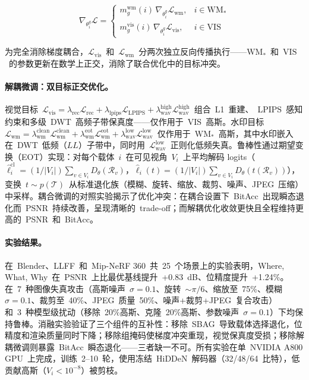 \begin{equation}
\nabla_{\theta_i^g} \mathcal{L} = \begin{cases} m_g^{\mathrm{wm}}(i)\,\nabla_{\theta_i^g} \mathcal{L}_{\mathrm{wm}}, & i \in \mathrm{WM}_* \\ m_g^{\mathrm{vis}}(i)\,\nabla_{\theta_i^g} \mathcal{L}_{\mathrm{vis}}, & i \in \mathrm{VIS} \end{cases}
\end{equation}

为完全消除梯度耦合，$\mathcal{L}_{\mathrm{vis}}$~和~$\mathcal{L}_{\mathrm{wm}}$~分两次独立反向传播执行——$\mathrm{WM}_*$~和~$\mathrm{VIS}$~的参数更新在数学上正交，消除了联合优化中的目标冲突。

\paragraph{解耦微调：双目标正交优化。}
视觉目标~$\mathcal{L}_{\mathrm{vis}} = \lambda_{\mathrm{rec}}\mathcal{L}_{\mathrm{rec}} + \lambda_{\mathrm{lpips}}\mathcal{L}_{\mathrm{LPIPS}} + \lambda_{\mathrm{wav}}^{\mathrm{high}}\mathcal{L}_{\mathrm{wav}}^{\mathrm{high}}$~组合~L1~重建、~LPIPS~感知约束和多级~DWT~高频子带保真度——仅作用于~VIS~高斯。水印目标~$\mathcal{L}_{\mathrm{wm}} = \lambda_{\mathrm{wm}}^{\mathrm{clean}}\mathcal{L}_{\mathrm{wm}}^{\mathrm{clean}} + \lambda_{\mathrm{wm}}^{\mathrm{eot}}\mathcal{L}_{\mathrm{wm}}^{\mathrm{eot}} + \lambda_{\mathrm{wav}}^{\mathrm{low}}\mathcal{L}_{\mathrm{wav}}^{\mathrm{low}}$~仅作用于~$\mathrm{WM}_*$~高斯，其中水印嵌入在~DWT~低频（$LL$）子带中，同时用~$\mathcal{L}_{\mathrm{wav}}^{\mathrm{low}}$~正则化低频失真。鲁棒性通过期望变换（EOT）实现：对每个载体~$i$~在可见视角~$V_i$~上平均解码 logits（$\hat{\ell}_i^{\mathrm{cl}} = (1/|V_i|)\sum_{v \in V_i} D_{\theta}(\mathcal{R}_v)$，$\hat{\ell}_i(t) = (1/|V_i|)\sum_{v \in V_i} D_{\theta}(t(\mathcal{R}_v))$），变换~$t \sim p(\mathcal{T})$~从标准退化族（模糊、旋转、缩放、裁剪、噪声、JPEG~压缩）中采样。耦合微调的对照实验揭示了优化冲突：在耦合设置下~BitAcc~出现瞬态退化而~PSNR~持续改善，呈现清晰的~trade-off；而解耦优化收敛更快且全程维持更高的~PSNR~和~BitAcc。

\paragraph{实验结果。}
在~Blender、LLFF~和~Mip-NeRF 360~共~25~个场景上的实验表明，Where, What, Why~在~PSNR~上比最优基线提升~+0.83~dB、位精度提升~+1.24\%。在~7~种图像失真攻击（高斯噪声~$\sigma=0.1$、旋转~$\sim\pi/6$、缩放至~75\%、模糊~$\sigma=0.1$、裁剪至~40\%、JPEG~质量~50\%、噪声+裁剪+JPEG~复合攻击）和~3~种模型级扰动（移除~20\%高斯、克隆~20\%高斯、参数噪声~$\sigma=0.1$）下均保持鲁棒。消融实验验证了三个组件的互补性：移除~SBAG~导致载体选择退化，位精度和渲染质量同时下降；移除组掩码使梯度冲突重现，视觉保真度受损；移除解耦微调则暴露~BitAcc~瞬态退化——三者缺一不可。所有实验在单~NVIDIA A800 GPU~上完成，训练~2--10~轮，使用冻结~HiDDeN~解码器（32/48/64~比特），低贡献高斯（$V_i < 10^{-8}$）被剪枝。

